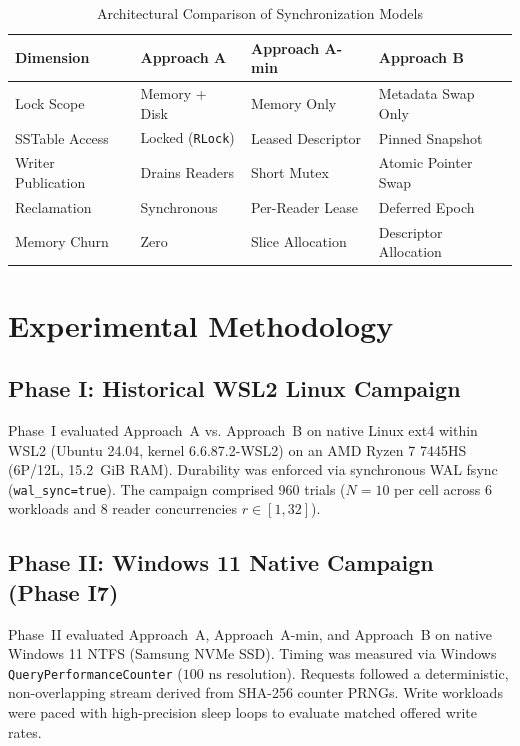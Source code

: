 \documentclass[conference]{IEEEtran}
\begin{document}
\begin{table}[h]
\caption{Architectural Comparison of Synchronization Models}
\label{tab:sync_comparison}
\centering
\footnotesize
\setlength{\tabcolsep}{4pt}
\begin{tabular}{@{}llll@{}}
\toprule
\textbf{Dimension} & \textbf{Approach A} & \textbf{Approach A-min} & \textbf{Approach B} \\
\midrule
Lock Scope & Memory + Disk & Memory Only & Metadata Swap Only \\
SSTable Access & Locked (\texttt{RLock}) & Leased Descriptor & Pinned Snapshot \\
Writer Publication & Drains Readers & Short Mutex & Atomic Pointer Swap \\
Reclamation & Synchronous & Per-Reader Lease & Deferred Epoch \\
Memory Churn & Zero & Slice Allocation & Descriptor Allocation \\
\bottomrule
\end{tabular}
\end{table}

\section{Experimental Methodology}

\subsection{Phase I: Historical WSL2 Linux Campaign}
Phase~I evaluated Approach~A vs. Approach~B on native Linux ext4 within WSL2 (Ubuntu 24.04, kernel 6.6.87.2-WSL2) on an AMD Ryzen 7 7445HS (6P/12L, 15.2~GiB RAM). Durability was enforced via synchronous WAL fsync (\texttt{wal\_sync=true}). The campaign comprised 960 trials ($N = 10$ per cell across 6 workloads and 8 reader concurrencies $r \in [1, 32]$).

\subsection{Phase II: Windows 11 Native Campaign (Phase I7)}
Phase~II evaluated Approach~A, Approach~A-min, and Approach~B on native Windows 11 NTFS (Samsung NVMe SSD). Timing was measured via Windows \texttt{QueryPerformanceCounter} ($100\text{ ns}$ resolution). Requests followed a deterministic, non-overlapping stream derived from SHA-256 counter PRNGs. Write workloads were paced with high-precision sleep loops to evaluate matched offered write rates.
\end{document}
